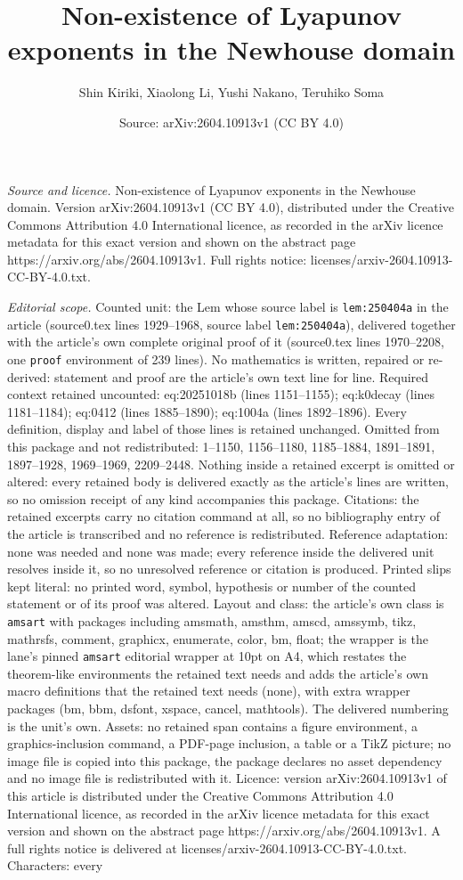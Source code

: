 \documentclass[10pt,a4paper]{amsart}
\title[Non-existence of Lyapunov exponents in the Newhouse domain]{Non-existence of Lyapunov exponents in the Newhouse domain}
\author{Shin Kiriki, Xiaolong Li, Yushi Nakano, Teruhiko Soma}
\date{Source: arXiv:2604.10913v1 (CC BY 4.0)}
\begin{document}
\maketitle

\noindent\emph{Source and licence.} Non-existence of Lyapunov exponents in the Newhouse domain. Version arXiv:2604.10913v1 (CC BY 4.0), distributed under the Creative Commons Attribution 4.0 International licence, as recorded in the arXiv licence metadata for this exact version and shown on the abstract page https://arxiv.org/abs/2604.10913v1. Full rights notice: licenses/arxiv-2604.10913-CC-BY-4.0.txt.\par\smallskip

\noindent\textit{Editorial scope.} Counted unit: the Lem whose source label is \texttt{lem:250404a} in the article (source0.tex lines 1929--1968, source label \texttt{lem:250404a}), delivered together with the article's own complete original proof of it (source0.tex lines 1970--2208, one \texttt{proof} environment of 239 lines). No mathematics is written, repaired or re-derived: statement and proof are the article's own text line for line. Required context retained uncounted: eq:20251018b (lines 1151--1155); eq:k0decay (lines 1181--1184); eq:0412 (lines 1885--1890); eq:1004a (lines 1892--1896). Every definition, display and label of those lines is retained unchanged. Omitted from this package and not redistributed: 1--1150, 1156--1180, 1185--1884, 1891--1891, 1897--1928, 1969--1969, 2209--2448. Nothing inside a retained excerpt is omitted or altered: every retained body is delivered exactly as the article's lines are written, so no omission receipt of any kind accompanies this package. Citations: the retained excerpts carry no citation command at all, so no bibliography entry of the article is transcribed and no reference is redistributed. Reference adaptation: none was needed and none was made; every reference inside the delivered unit resolves inside it, so no unresolved reference or citation is produced. Printed slips kept literal: no printed word, symbol, hypothesis or number of the counted statement or of its proof was altered. Layout and class: the article's own class is \texttt{amsart} with packages including amsmath, amsthm, amscd, amssymb, tikz, mathrsfs, comment, graphicx, enumerate, color, bm, float; the wrapper is the lane's pinned \texttt{amsart} editorial wrapper at 10pt on A4, which restates the theorem-like environments the retained text needs and adds the article's own macro definitions that the retained text needs (none), with extra wrapper packages (bm, bbm, dsfont, xspace, cancel, mathtools). The delivered numbering is the unit's own. Assets: no retained span contains a figure environment, a graphics-inclusion command, a PDF-page inclusion, a table or a TikZ picture; no image file is copied into this package, the package declares no asset dependency and no image file is redistributed with it. Licence: version arXiv:2604.10913v1 of this article is distributed under the Creative Commons Attribution 4.0 International licence, as recorded in the arXiv licence metadata for this exact version and shown on the abstract page https://arxiv.org/abs/2604.10913v1. A full rights notice is delivered at licenses/arxiv-2604.10913-CC-BY-4.0.txt. Characters: every 
\end{document}
